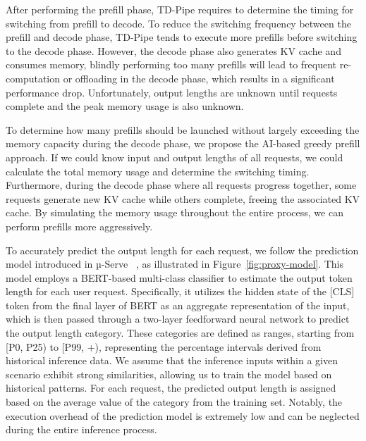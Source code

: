 After performing the prefill phase, TD-Pipe requires to determine the timing for switching from prefill to decode.
To reduce the switching frequency between the prefill and decode phase, TD-Pipe tends to execute more prefills before switching to the decode phase.
However, the decode phase also generates KV cache and consumes memory, blindly performing too many prefills will lead to frequent re-computation or offloading in the decode phase, which results in a significant performance drop.
Unfortunately, output lengths are unknown until requests complete and the peak memory usage is also unknown.

To determine how many prefills should be launched without largely exceeding the memory capacity during the decode phase, we propose the AI-based greedy prefill approach.
If we could know input and output lengths of all requests, we could calculate the total memory usage and determine the switching timing.
Furthermore, during the decode phase where all requests progress together, some requests generate new KV cache while others complete, freeing the associated KV cache.
By simulating the memory usage throughout the entire process, we can perform prefills more aggressively. 

To accurately predict the output length for each request, we follow the prediction model introduced in µ-Serve ~\cite{qiu2024muserve}, as illustrated in Figure~\ref{fig:proxy-model}. This model employs a BERT-based multi-class classifier to estimate the output token length for each user request. Specifically, it utilizes the hidden state of the [CLS] token from the final layer of BERT as an aggregate representation of the input, which is then passed through a two-layer feedforward neural network to predict the output length category. These categories are defined as ranges, starting from [P0, P25) to [P99, +), representing the percentage intervals derived from historical inference data. We assume that the inference inputs within a given scenario exhibit strong similarities, allowing us to train the model based on historical patterns. For each request, the predicted output length is assigned based on the average value of the category from the training set. 
Notably, the execution overhead of the prediction model is extremely low and can be neglected during the entire inference process.

